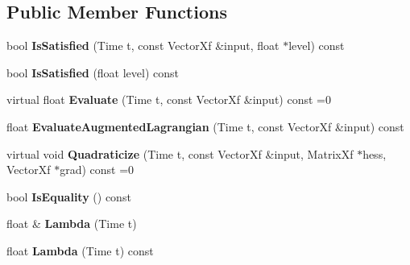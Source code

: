 \subsection*{Public Member Functions}
\begin{DoxyCompactItemize}
\item 
bool {\bfseries Is\+Satisfied} (Time t, const Vector\+Xf \&input, float $\ast$level) const \hypertarget{classilqgames_1_1_constraint_a53f7a194695153ab3c66598c54553cdf}{}\label{classilqgames_1_1_constraint_a53f7a194695153ab3c66598c54553cdf}

\item 
bool {\bfseries Is\+Satisfied} (float level) const \hypertarget{classilqgames_1_1_constraint_aa5c764487cb888508c8bea165a0c532b}{}\label{classilqgames_1_1_constraint_aa5c764487cb888508c8bea165a0c532b}

\item 
virtual float {\bfseries Evaluate} (Time t, const Vector\+Xf \&input) const =0\hypertarget{classilqgames_1_1_constraint_a399cd2ac91e7e09f58ef37cab151d4f4}{}\label{classilqgames_1_1_constraint_a399cd2ac91e7e09f58ef37cab151d4f4}

\item 
float {\bfseries Evaluate\+Augmented\+Lagrangian} (Time t, const Vector\+Xf \&input) const \hypertarget{classilqgames_1_1_constraint_a0d2a13d153e73dd815fe9e08b2fab978}{}\label{classilqgames_1_1_constraint_a0d2a13d153e73dd815fe9e08b2fab978}

\item 
virtual void {\bfseries Quadraticize} (Time t, const Vector\+Xf \&input, Matrix\+Xf $\ast$hess, Vector\+Xf $\ast$grad) const =0\hypertarget{classilqgames_1_1_constraint_a94538ad0da7e881d1a3bd4009c43f775}{}\label{classilqgames_1_1_constraint_a94538ad0da7e881d1a3bd4009c43f775}

\item 
bool {\bfseries Is\+Equality} () const \hypertarget{classilqgames_1_1_constraint_a5d825e56fb8435de0f55c23e4af84d6a}{}\label{classilqgames_1_1_constraint_a5d825e56fb8435de0f55c23e4af84d6a}

\item 
float \& {\bfseries Lambda} (Time t)\hypertarget{classilqgames_1_1_constraint_a99560d1b41f475b8327e742ea6e75306}{}\label{classilqgames_1_1_constraint_a99560d1b41f475b8327e742ea6e75306}

\item 
float {\bfseries Lambda} (Time t) const \hypertarget{classilqgames_1_1_constraint_a92c777a068225fc5bcd982b2ece55ca3}{}\label{classilqgames_1_1_constraint_a92c777a068225fc5bcd982b2ece55ca3}


\end{DoxyCompactItemize}
